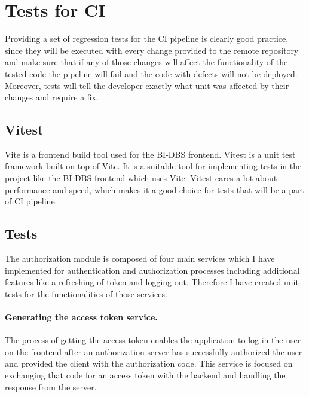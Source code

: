 \section{Tests for CI} Providing a set of regression tests for the CI pipeline is clearly good practice, since they will be executed with every change provided to the remote repository and make sure that if any of those changes will affect the functionality of the tested code the pipeline will fail and the code with defects will not be deployed. Moreover, tests will tell the developer exactly what unit was affected by their changes and require a fix.


\subsection{Vitest} Vite is a frontend build tool used for the BI-DBS frontend. Vitest is a unit test framework built on top of Vite. It is a suitable tool for implementing tests in the project like the BI-DBS frontend which uses Vite. Vitest cares a lot about performance and speed, which makes it a good choice for tests that will be a part of CI pipeline.

\subsection{Tests} The authorization module is composed of four main services which I have implemented for authentication and authorization processes including additional features like a refreshing of token and logging out. Therefore I have created unit tests for the functionalities of those services.\\


\paragraph*{Generating the access token service.} The process of getting the access token enables the application to log in the user on the frontend after an authorization server has successfully authorized the user and provided the client with the authorization code. This service is focused on exchanging that code for an access token with the backend and handling the response from the server.


